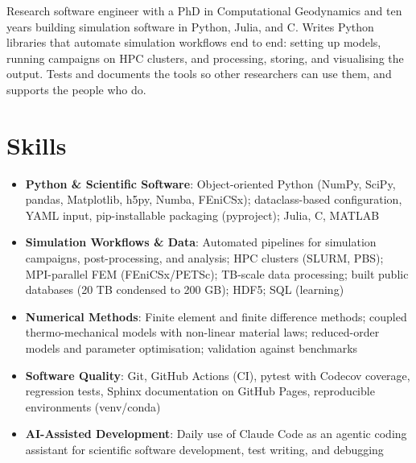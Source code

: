 \documentclass[11pt,a4paper,sans]{moderncv}
\begin{document}
\makecvtitle


\vspace{6pt}
\small{Research software engineer with a PhD in Computational Geodynamics and ten years building simulation software in Python, Julia, and C. Writes Python libraries that automate simulation workflows end to end: setting up models, running campaigns on HPC clusters, and processing, storing, and visualising the output. Tests and documents the tools so other researchers can use them, and supports the people who do.}


\section{Skills}
\vspace{1pt}
\begin{itemize}

\item \textbf{Python \& Scientific Software}: Object-oriented Python (NumPy, SciPy, pandas, Matplotlib, h5py, Numba, FEniCSx); dataclass-based configuration, YAML input, pip-installable packaging (pyproject); Julia, C, MATLAB

\item \textbf{Simulation Workflows \& Data}: Automated pipelines for simulation campaigns, post-processing, and analysis; HPC clusters (SLURM, PBS); MPI-parallel FEM (FEniCSx/PETSc); TB-scale data processing; built public databases (20 TB condensed to 200 GB); HDF5; SQL (learning)

\item \textbf{Numerical Methods}: Finite element and finite difference methods; coupled thermo-mechanical models with non-linear material laws; reduced-order models and parameter optimisation; validation against benchmarks

\item \textbf{Software Quality}: Git, GitHub Actions (CI), pytest with Codecov coverage, regression tests, Sphinx documentation on GitHub Pages, reproducible environments (venv/conda)

\item \textbf{AI-Assisted Development}: Daily use of Claude Code as an agentic coding assistant for scientific software development, test writing, and debugging

\end{itemize}
\end{document}
